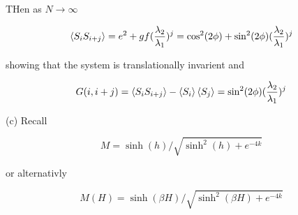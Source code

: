 \documentclass[12pt]{article}
\numberwithin{equation}{section}
\begin{document}
THen as $N \to \infty$

\begin{equation}
    \expval{S_i S_{i+j}} = e^2 + gf(\frac{\lambda_2}{\lambda_1})^j = \cos^2(2\phi) + \sin^2(2\phi)(\frac{\lambda_2}{\lambda_1})^j
\end{equation}

showing that the system is translationally invarient and 

\begin{equation}
    G(i, i+j) = \expval{S_iS_{i+j}} - \expval{S_i}\expval{S_{j}} = \sin^2(2\phi)(\frac{\lambda_2}{\lambda_1})^j
\end{equation}

(c) Recall 

\begin{equation}
    M = \sinh(h) / \sqrt{\sinh^2(h) + e^{-4k}}
\end{equation}

or alternativly 

\begin{equation}
    M(H) = \sinh(\beta H ) / \sqrt{\sinh^2(\beta H) + e^{-4k}}
\end{equation}
\end{document}
